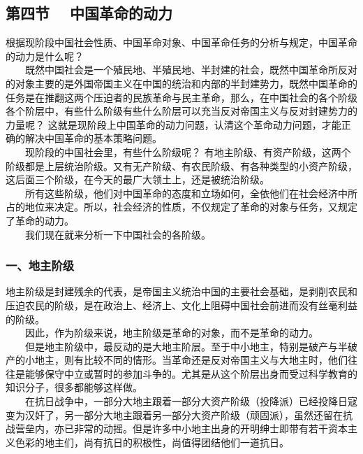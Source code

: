 \documentclass[cn,11pt,chinese]{elegantbook}
\def\myformat#1{\hfil\hfil #1}
\begin{document}
\subsection*{\myformat{第四节 　中国革命的动力}}
根据现阶段中国社会性质、中国革命对象、中国革命任务的分析与规定，中国革命的动力是什么呢？\\
　　既然中国社会是一个殖民地、半殖民地、半封建的社会，既然中国革命所反对的对象主要的是外国帝国主义在中国的统治和内部的半封建势力，既然中国革命的任务是在推翻这两个压迫者的民族革命与民主革命，那么，在中国社会的各个阶级各个阶层中，有些什么阶级有些什么阶层可以充当反对帝国主义与反对封建势力的力量呢？ 这就是现阶段上中国革命的动力问题，认清这个革命动力问题，才能正确的解决中国革命的基本策略问题。\\
　　现阶段的中国社会里，有些什么阶级呢？ 有地主阶级、有资产阶级，这两个阶级都是上层统治阶级。又有无产阶级、有农民阶级、有各种类型的小资产阶级，这后面三个阶级，在今天的最广大领土上，还是被统治阶级。\\
　　所有这些阶级，他们对中国革命的态度和立场如何，全依他们在社会经济中所占的地位来决定。所以，社会经济的性质，不仅规定了革命的对象与任务，又规定了革命的动力。\\
　　我们现在就来分析一下中国社会的各阶级。\\
\subsubsection*{\myformat{一、地主阶级}}
地主阶级是封建残余的代表，是帝国主义统治中国的主要社会基础，是剥削农民和压迫农民的阶级，是在政治上、经济上、文化上阻碍中国社会前进而没有丝毫利益的阶级。\\
　　因此，作为阶级来说，地主阶级是革命的对象，而不是革命的动力。\\
　　但是地主阶级中，最反动的是大地主阶层。至于中小地主，特别是破产与半破产的小地主，则有比较不同的情形。当革命还是反对帝国主义与大地主时，他们往往是能够保守中立或暂时的参加斗争的。尤其是从这个阶层出身而受过科学教育的知识分子，很多都能够这样做。\\
　　在抗日战争中，一部分大地主跟着一部分大资产阶级（投降派）已经投降日寇变为汉奸了，另一部分大地主跟着另一部分大资产阶级（顽固派），虽然还留在抗战营垒内，亦已非常的动摇。但是许多中小地主出身的开明绅士即带有若干资本主义色彩的地主们，尚有抗日的积极性，尚值得团结他们一道抗日。\\
\end{document}
